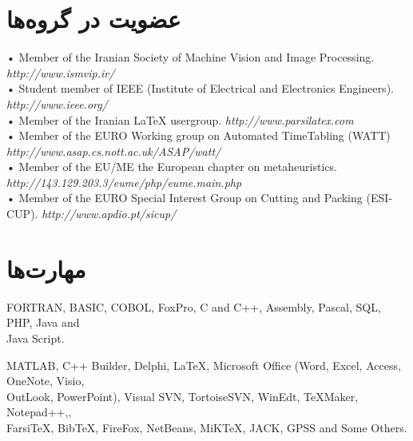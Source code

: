 \documentclass[11pt,a4paper]{bidimoderncv}
\begin{document}
\section{عضویت در گروه‌ها}
\begin{latin}
\begin{flushleft}
{\small • Member of the Iranian Society of Machine Vision and Image Processing. \hfill {\scriptsize\em http://www.ismvip.ir/}}\\
{\small • Student member of IEEE (Institute of Electrical and Electronics Engineers). \hfill {\scriptsize\em http://www.ieee.org/}}\\
{\small • Member of the Iranian \LaTeX{} usergroup. \hfill {\scriptsize\em http://www.parsilatex.com}}\\
{\small • Member of the EURO Working group on Automated TimeTabling (WATT) \hfill {\scriptsize\em http://www.asap.cs.nott.ac.uk/ASAP/watt/}}\\
{\small • Member of the EU/ME the European chapter on metaheuristics. \hfill {\scriptsize\em http://143.129.203.3/eume/php/eume.main.php}}\\
{\small • Member of the EURO Special Interest Group on Cutting and Packing (ESICUP). \hfill {\scriptsize\em http://www.apdio.pt/sicup/}}\\
\end{flushleft}
\end{latin}

\section{مهارت‌ها}
\begin{flushleft}
\begin{latin}
{FORTRAN, BASIC, COBOL, FoxPro, C and C++, Assembly, Pascal, SQL, PHP, Java and\\ Java Script.}
\end{latin}
\end{flushleft}
\begin{flushleft}
\begin{latin}
 MATLAB, C++ Builder, Delphi, \LaTeX, Microsoft Office (Word, Excel, Access, OneNote, Visio,\\ 
 OutLook, PowerPoint), Visual SVN, TortoiseSVN, WinEdt, TeXMaker, Notepad++,\XePersian, \\
 Farsi\TeX, Bib\TeX, FireFox, NetBeans, MiKTeX, JACK, GPSS and Some Others.
\end{latin}
\end{flushleft}
\end{document}

